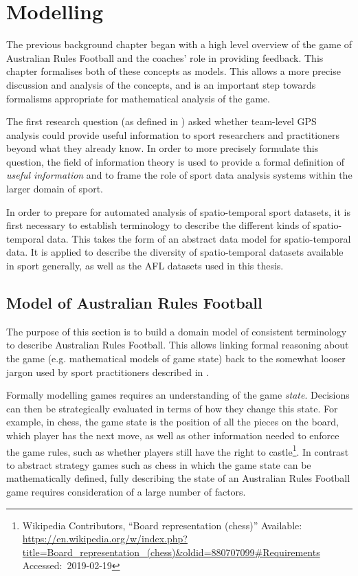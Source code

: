 \chapter{Modelling}
\label{ch:modelling}
\startchapter

The previous background chapter began with a high level overview of the game of Australian Rules Football and the coaches' role in providing feedback. This chapter formalises both of these concepts as models. This allows a more precise discussion and analysis of the concepts, and is an important step towards formalisms appropriate for mathematical analysis of the game.

The first research question (as defined in ) asked whether team-level GPS analysis could provide useful information to sport researchers and practitioners beyond what they already know. In order to more precisely formulate this question, the field of information theory \cite{Shannon1948} is used to provide a formal definition of \textit{useful information} and to frame the role of sport data analysis systems within the larger domain of sport.

In order to prepare for automated analysis of spatio-temporal sport datasets, it is first necessary to establish terminology to describe the different kinds of spatio-temporal data. This takes the form of an abstract data model for spatio-temporal data. It is applied to describe the diversity of spatio-temporal datasets available in sport generally, as well as the AFL datasets used in this thesis.


\section{Model of Australian Rules Football}
\label{sec:model-of-afl}

The purpose of this section is to build a domain model of consistent terminology to describe Australian Rules Football. This allows linking formal reasoning about the game (e.g. mathematical models of game state) back to the somewhat looser jargon used by sport practitioners described in .


Formally modelling games requires an understanding of the game \emph{state}. Decisions can then be strategically evaluated in terms of how they change this state. For example, in chess, the game state is the position of all the pieces on the board, which player has the next move, as well as other information needed to enforce the game rules, such as whether players still have the right to castle\footnote{Wikipedia Contributors, ``Board representation (chess)'' Available: \url{https://en.wikipedia.org/w/index.php?title=Board\_representation\_(chess)&oldid=880707099\#Requirements} Accessed:~2019-02-19}. In contrast to abstract strategy games such as chess in which the game state can be mathematically defined, fully describing the state of an Australian Rules Football game requires consideration of a large number of factors.

